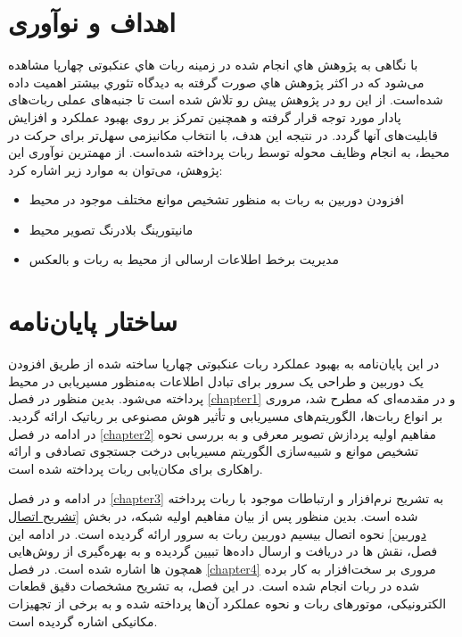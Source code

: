 


\section{اهداف و نوآوری}

با نگاهی به پژوهش هاي انجام شده در زمينه ربات هاي عنکبوتی چهارپا مشاهده می‌شود كه در اكثر پژوهش هاي صورت گرفته به ديدگاه تئوري بيشتر اهمیت داده شده‌است. از این رو در پژوهش پيش رو تلاش شده است تا جنبه‌های عملی ربات‌‌های پادار مورد توجه قرار گرفته و همچنین تمرکز بر روی بهبود عملکرد و افزایش قابلیت‌های آنها گردد. در نتیجه این هدف، با انتخاب مکانیزمی سهل‌تر برای حرکت در محیط، به انجام وظایف محوله توسط ربات پرداخته شده‌است.
از مهمترین نوآوری این پژوهش، می‌توان به موارد زیر اشاره کرد:
\begin{itemize}
	\item
	افزودن دوربین به ربات به منظور تشخیص موانع مختلف موجود در محیط
	\item
	مانیتورینگ بلادرنگ
	\noindent\unskip{}
	تصویر محیط
	\item
	مدیریت برخط
	\noindent\unskip{}
	اطلاعات ارسالی از محیط به ربات و بالعکس
\end{itemize}

\section{ساختار پایان‌نامه}
در این پایان‌نامه به بهبود عملکرد ربات‌ عنکبوتی چهارپا ساخته شده از طریق افزودن یک دوربین و طراحی یک سرور برای تبادل اطلاعات به‌منظور مسیریابی در محیط پرداخته می‌شود.
بدین منظور در فصل
\ref{chapter1}
و در مقدمه‌ای که مطرح شد، مروری بر انواع ربات‌ها، الگوریتم‌های مسیریابی و تأثیر هوش مصنوعی بر رباتیک ارائه گردید. در ادامه در فصل
\ref{chapter2}
مفاهیم اولیه پردازش تصویر معرفی و به بررسی نحوه تشخیص موانع و شبیه‌سازی الگوریتم مسیریابی درخت جستجوی تصادفی و ارائه راهکاری برای مکان‌یابی ربات پرداخته شده است.

در ادامه و در فصل
\ref{chapter3}
به تشریح نرم‌افزار و ارتباطات موجود با ربات پرداخته شده است. بدین منظور پس از بیان مفاهیم اولیه شبکه، در بخش
\ref{تشریح اتصال دوربین}
نحوه اتصال بیسیم دوربین ربات به سرور ارائه گردیده است. در ادامه این فصل، نقش
ها در دریافت و ارسال داده‌ها تبیین گردیده و به بهره‌گیری از روش‌هایی همچون
ها اشاره شده است.
در فصل
\ref{chapter4}
مروری بر سخت‌افزار به کار برده شده در ربات انجام شده است. در این فصل، به تشریح مشخصات دقیق قطعات الکترونیکی، موتورهای ربات و نحوه عملکرد آن‌ها پرداخته شده و به برخی از تجهیزات مکانیکی اشاره گردیده است.

